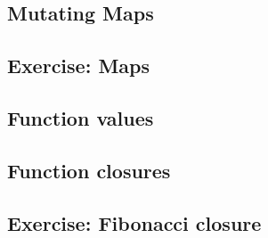 \subsection{Mutating Maps}




\subsection{Exercise: Maps}


% 

\subsection{Function values}




\subsection{Function closures}




\subsection{Exercise: Fibonacci closure}


% 
